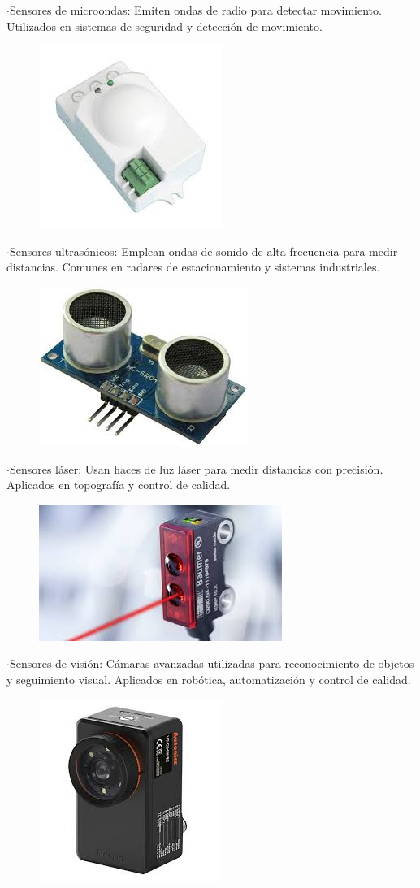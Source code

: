 \newpage
	$\cdot$Sensores de microondas: Emiten ondas de radio para detectar movimiento. Utilizados en sistemas de seguridad y detección de movimiento.
	
	
\begin{figure} [h]
	\centering
	\includegraphics[width=0.3\linewidth]{img/sensormicroondas}
	\caption{}
	\label{fig:sensormicroondas}
\end{figure}
	
	
	$\cdot$Sensores ultrasónicos: Emplean ondas de sonido de alta frecuencia para medir distancias. Comunes en radares de estacionamiento y sistemas industriales.
	
	
\begin{figure} [h]
	\centering
	\includegraphics[width=0.3\linewidth]{img/sensorultrasonico}
	\caption{}
	\label{fig:sensorultrasonico}
\end{figure}
	
	
	$\cdot$Sensores láser: Usan haces de luz láser para medir distancias con precisión. Aplicados en topografía y control de calidad.
	
	
\begin{figure} [h]
	\centering
	\includegraphics[width=0.3\linewidth]{img/sensorlaser}
	\caption{}
	\label{fig:sensorlaser}
\end{figure}

\newpage
	$\cdot$Sensores de visión: Cámaras avanzadas utilizadas para reconocimiento de objetos y seguimiento visual. Aplicados en robótica, automatización y control de calidad.
	
	
\begin{figure} [h]
	\centering
	\includegraphics[width=0.3\linewidth]{img/sensorvision}
	\caption{}
	\label{fig:sensorvision}
\end{figure}


